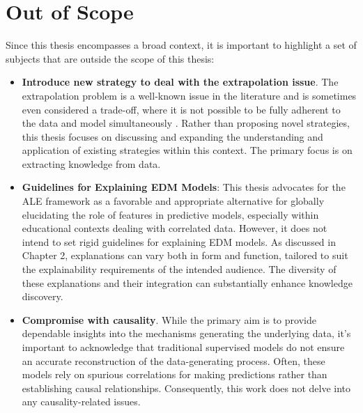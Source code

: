 \section{Out of Scope}
\label{fora_escopo}

Since this thesis encompasses a broad context, it is important to highlight a set of subjects that are outside the scope of this thesis:

\begin{itemize}
    \item \textbf{Introduce new strategy to deal with the extrapolation issue}. The extrapolation problem is a well-known issue in the literature and is sometimes even considered a trade-off, where it is not possible to be fully adherent to the data and model simultaneously \cite{Lundberg2020FromTrees., Chen2020TrueData}. Rather than proposing novel strategies, this thesis focuses on discussing and expanding the understanding and application of existing strategies within this context. The primary focus is on extracting knowledge from data.

    \item \textbf{Guidelines for Explaining EDM Models}: This thesis advocates for the ALE framework as a favorable and appropriate alternative for globally elucidating the role of features in predictive models, especially within educational contexts dealing with correlated data. However, it does not intend to set rigid guidelines for explaining EDM models. As discussed in Chapter 2, explanations can vary both in form and function, tailored to suit the explainability requirements of the intended audience. The diversity of these explanations and their integration can substantially enhance knowledge discovery.

    \item \textbf{Compromise with causality}.  While the primary aim is to provide dependable insights into the mechanisms generating the underlying data, it's important to acknowledge that traditional supervised models do not ensure an accurate reconstruction of the data-generating process. Often, these models rely on spurious correlations for making predictions rather than establishing causal relationships. Consequently, this work does not delve into any causality-related issues.
    
\end{itemize}
